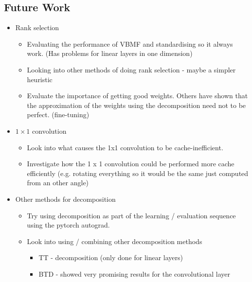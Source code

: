 \subsection{Future Work} \label{tex:future_work}
\begin{itemize}
    \item Rank selection
    \begin{itemize}
    \item Evaluating the performance of VBMF and standardising so it always work. (Has problems for linear layers in one dimension)
	\item Looking into other methods of doing rank selection - maybe a simpler heuristic
	\item Evaluate the importance of getting good weights. Others have shown that the approximation of the weights using the decomposition need not to be perfect. (fine-tuning)
    \end{itemize}
    \item $1\times 1$ convolution
    \begin{itemize}
        \item  Look into what causes the 1x1 convolution to be cache-inefficient.
	    \item Investigate how the 1 x 1 convolution could be performed more cache efficiently (e.g. rotating everything so it would be the same just computed from an other angle)
    \end{itemize}
    \item Other methods for decomposition
    \begin{itemize}
        \item Try using decomposition as part of the learning / evaluation sequence using the pytorch autograd. 
        \item Look into using / combining other decomposition methods
        \begin{itemize}
            \item TT - decomposition (only done for linear layers)
		    \item BTD - showed very promising results for the convolutional layer
        \end{itemize}
    \end{itemize}
\end{itemize}